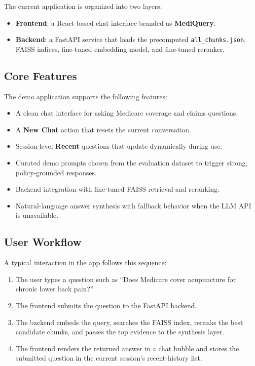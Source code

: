 \documentclass[10pt, letterpaper]{article}
\begin{document}
The current application is organized into two layers:

\begin{itemize}[noitemsep, topsep=4pt]
    \item \textbf{Frontend}: a React-based chat interface branded as \textbf{MediQuery}.
    \item \textbf{Backend}: a FastAPI service that loads the precomputed
          \texttt{all\_chunks.json}, FAISS indices, fine-tuned embedding model, and
          fine-tuned reranker.
\end{itemize}

\subsection{Core Features}

The demo application supports the following features:

\begin{itemize}[noitemsep, topsep=4pt]
    \item A clean chat interface for asking Medicare coverage and claims questions.
    \item A \textbf{New Chat} action that resets the current conversation.
    \item Session-level \textbf{Recent} questions that update dynamically during use.
    \item Curated demo prompts chosen from the evaluation dataset to trigger strong,
          policy-grounded responses.
    \item Backend integration with fine-tuned FAISS retrieval and reranking.
    \item Natural-language answer synthesis with fallback behavior when the LLM API is
          unavailable.
\end{itemize}

\subsection{User Workflow}

A typical interaction in the app follows this sequence:

\begin{enumerate}[noitemsep, topsep=4pt]
    \item The user types a question such as ``Does Medicare cover acupuncture for
          chronic lower back pain?''
    \item The frontend submits the question to the FastAPI backend.
    \item The backend embeds the query, searches the FAISS index, reranks the best
          candidate chunks, and passes the top evidence to the synthesis layer.
    \item The frontend renders the returned answer in a chat bubble and stores the
          submitted question in the current session's recent-history list.
\end{enumerate}
\end{document}
